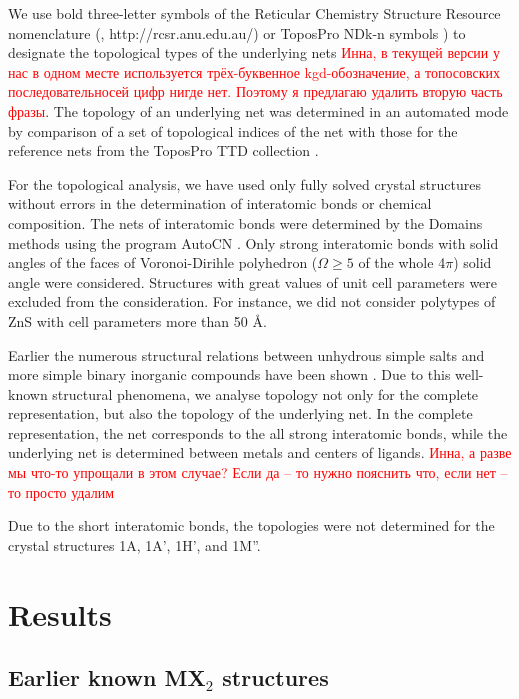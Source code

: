 \documentclass[a4paperm]{article}
\begin{document}
We use bold three-letter symbols of the Reticular Chemistry Structure Resource nomenclature (\cite{rcsr}, http://rcsr.anu.edu.au/) or ToposPro NDk-n symbols \cite{rcsr_2}) to designate the topological types of the underlying nets
\textcolor{red}{Инна, в текущей версии у нас в одном месте используется трёх-буквенное kgd-обозначение, а топосовских последовательносей цифр нигде нет. Поэтому я предлагаю удалить вторую часть фразы}.
The topology of an underlying net was determined in an automated mode by comparison of a set of topological indices of the net with those for the reference nets from the ToposPro TTD collection \cite{TTD}.

For the topological analysis, we have used only fully solved crystal structures without errors in the determination of interatomic bonds or chemical composition.
The nets of interatomic bonds were determined by the Domains methods using the program AutoCN \cite{blatov2016_rods}. 
Only strong interatomic bonds with solid angles of the faces of Voronoi-Dirihle polyhedron ($\Omega \geq 5 $ of the whole 4$\pi$) solid angle were considered.
Structures with great values of unit cell parameters were excluded from the consideration.
For instance, we did not consider polytypes of ZnS with cell parameters more than 50 \AA.

Earlier the numerous structural relations between unhydrous simple salts and more simple binary inorganic compounds have been shown \cite{blatov2011_salts, medrish2020_zintl}. 
Due to this well-known structural phenomena, we analyse topology not only for the complete  representation, but also the topology of the underlying net.
In the complete representation, the net corresponds to the all strong interatomic bonds, while the underlying net is determined between metals and centers of ligands.
\textcolor{red}{Инна, а разве мы что-то упрощали в этом случае? Если да -- то нужно пояснить что, если нет -- то просто удалим}

Due to the short interatomic bonds, the topologies were not determined for the crystal structures 1A, 1A', 1H', and  1M''.


			\section{Results}

\subsection*{Earlier known MX$_2$ structures}
\end{document}
